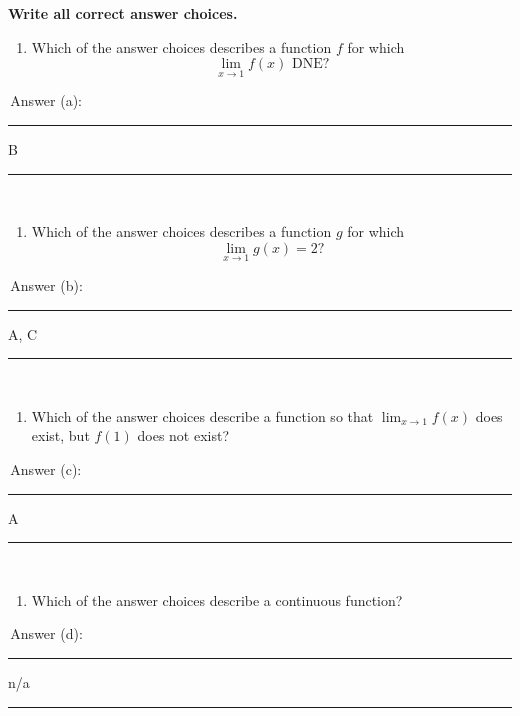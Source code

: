 \documentclass[11pt]{article}
\begin{document}
\begin{enumerate}
\bigskip
\hfill {\bf Write all correct answer choices.} \hfill \\



\begin{minipage}[t]{0.48\textwidth}
\begin{enumerate}
\item[(a)] Which of the answer choices describes a function $f$ for which 
\[
\lim_{x\to1}f(x) \text{ DNE?}
\]
\end{enumerate}

\,\hfill Answer (a):
\rule[-8pt]{1in}{0.4pt}{\color{blue} B}\rule[-8pt]{1in}{0.4pt} \\
\end{minipage}
%
\hfill
%
\begin{minipage}[t]{0.48\textwidth}
\begin{enumerate}
\item[(b)] Which of the answer choices describes a function $g$ for which 
\[
\lim_{x\to1}g(x)=2?
\]
\end{enumerate}

\,\hfill Answer (b):
\rule[-8pt]{1in}{0.2pt}{\color{blue} A, C}\rule[-8pt]{1in}{0.2pt} \\
\end{minipage}

\vspace{2cm}  %

\begin{minipage}[t]{0.48\textwidth}
\begin{enumerate}
\item[(c)] Which of the answer choices describe a function so that $\displaystyle \lim_{x\to1}f(x)$ does exist, but $f(1)$ does not exist?
\end{enumerate}

\,\hfill Answer (c):
\rule[-8pt]{1in}{0.4pt}{\color{blue} A}\rule[-8pt]{1in}{0.4pt} \\
\end{minipage}
%
\hfill
%
\begin{minipage}[t]{0.48\textwidth}
\begin{enumerate}
\item[(d)] Which of the answer choices describe a continuous function?\\
\end{enumerate}

\,\hfill Answer (d):
\rule[-8pt]{1in}{0.3pt}{\color{blue} n/a}\rule[-8pt]{1in}{0.3pt} \\
\end{minipage}
\newpage


\end{enumerate}
\end{document}
